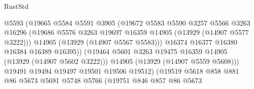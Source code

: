 \begin{lexlean}{RustStd}
\begin{coremodule}
                                      @5593
                                      (@19665
                                        @5584
                                        @5591
                                        @3905
                                        (@19672
                                          @5583
                                          @5590
                                          @3257
                                          @5566
                                          @3263
                                          @16296
                                          (@19686
                                            @5576
                                            @3263
                                            @19697
                                            @16359
                                            @14905
                                            (@13929 (@14907 @5577 @3222)))
                                          @14905
                                          (@13929 (@14907 @5567 @5583)))
                                        @16374
                                        @16377
                                        @16380
                                        @16384
                                        @16389
                                        @16395))
                                    (@19464
                                      @5601
                                      @3263
                                      @19475
                                      @16359
                                      @14905
                                      (@13929 (@14907 @5602 @3222)))
                                    @14905
                                    (@13929 (@14907 @5559 @5608)))
                                  @19491
                                  @19494
                                  @19497
                                  @19501
                                  @19506
                                  @19512)
                                (@19519
                                  @5618
                                  @858
                                  @881
                                  @86
                                  @5673
                                  @5691
                                  @5748
                                  @5766
                                  (@19751
                                    @846
                                    @857
                                    @86
                                    @5673

\end{coremodule}
\end{lexlean}
